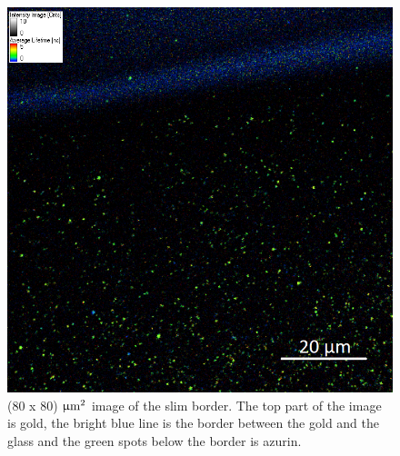 \documentclass[twoside,single]{lion-msc}
\begin{document}
\begin{figure}[ht!]
\centering
\includegraphics[width=\textwidth]{border_legenda}
\caption{(80 x 80) $\upmu \textup{m}^{2}$ image of the slim border. The top part of the image is gold, the bright blue line is the border between the gold and the glass and the green spots below the border is azurin.}
\label{border}
\end{figure}
\end{document}
